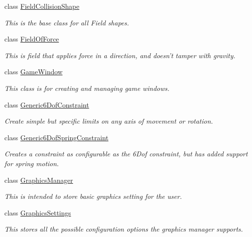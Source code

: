 \begin{DoxyCompactItemize}
class \hyperlink{classMezzanine_1_1FieldCollisionShape}{FieldCollisionShape}
\begin{DoxyCompactList}\small\item\em This is the base class for all Field shapes. \item\end{DoxyCompactList}\item 
class \hyperlink{classMezzanine_1_1FieldOfForce}{FieldOfForce}
\begin{DoxyCompactList}\small\item\em This is field that applies force in a direction, and doesn't tamper with gravity. \item\end{DoxyCompactList}\item 
class \hyperlink{classMezzanine_1_1GameWindow}{GameWindow}
\begin{DoxyCompactList}\small\item\em This class is for creating and managing game windows. \item\end{DoxyCompactList}\item 
class \hyperlink{classMezzanine_1_1Generic6DofConstraint}{Generic6DofConstraint}
\begin{DoxyCompactList}\small\item\em Create simple but specific limits on any axis of movement or rotation. \item\end{DoxyCompactList}\item 
class \hyperlink{classMezzanine_1_1Generic6DofSpringConstraint}{Generic6DofSpringConstraint}
\begin{DoxyCompactList}\small\item\em Creates a constraint as configurable as the 6Dof constraint, but has added support for spring motion. \item\end{DoxyCompactList}\item 
class \hyperlink{classMezzanine_1_1GraphicsManager}{GraphicsManager}
\begin{DoxyCompactList}\small\item\em This is intended to store basic graphics setting for the user. \item\end{DoxyCompactList}\item 
class \hyperlink{structMezzanine_1_1GraphicsSettings}{GraphicsSettings}
\begin{DoxyCompactList}\small\item\em This stores all the possible configuration options the graphics manager supports. \item\end{DoxyCompactList}\item 

\end{DoxyCompactItemize}
